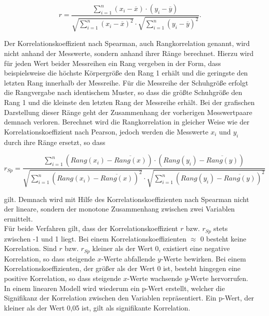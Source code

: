 \begin{equation}
r =  \frac{\sum \limits_{i=1}^n (x_i-\overline{x}) \cdot (y_i-\overline{y})}{\sqrt{\sum \limits_{i=1}^n (x_i-\overline{x})^2} \cdot \sqrt{\sum \limits_{i=1}^n (y_i-\overline{y})^2}}.
	\label{eq:pearson}
\end{equation}

Der Korrelationskoeffizient nach Spearman, auch Rangkorrelation genannt, wird nicht anhand der Messwerte, sondern anhand ihrer Ränge berechnet. Hierzu wird für jeden Wert beider Messreihen ein Rang vergeben in der Form, dass beispielsweise die höchste Körpergröße den Rang 1 erhält und die geringste den letzten Rang innerhalb der Messreihe. Für die Messreihe der Schuhgröße erfolgt die Rangvergabe nach identischem Muster, so dass die größte Schuhgröße den Rang 1 und die kleinste den letzten Rang der Messreihe erhält. Bei der grafischen Darstellung dieser Ränge geht der Zusammenhang der vorherigen Messwertpaare demnach verloren. Berechnet wird die Rangkorrelation in gleicher Weise wie der Korrelationskoeffizient nach Pearson, jedoch werden die Messwerte $x_i$ und $y_i$ durch ihre Ränge ersetzt, so dass 

\begin{equation}
r_{Sp} =  \frac{\sum \limits_{i=1}^n (Rang(x_i)-\overline{Rang(x)}) \cdot (Rang(y_i)-\overline{Rang(y)})}{\sqrt{\sum \limits_{i=1}^n (Rang(x_i)-\overline{Rang(x)})^2} \cdot \sqrt{\sum \limits_{i=1}^n (Rang(y_i)-\overline{Rang(y)})^2}}
	\label{eq:spearman}
\end{equation}

gilt. Demnach wird mit Hilfe des Korrelationskoeffizienten nach Spearman nicht der lineare, sondern der monotone Zusammenhang zwischen zwei Variablen ermittelt. \parencite{frank_einfach_2006}\\

Für beide Verfahren gilt, dass der Korrelationskoeffizient $r$ bzw. $r_{Sp}$ stets zwischen -1 und 1 liegt. Bei einem Korrelationskoeffizienten $\approx$ 0 besteht keine Korrelation. Sind $r$ bzw. $r_{Sp}$ kleiner als der Wert 0, existiert eine negative Korrelation, so dass steigende $x$-Werte abfallende $y$-Werte bewirken. Bei einem Korrelationskoeffizienten, der größer als der Wert 0 ist, besteht hingegen eine positive Korrelation, so dass steigende $x$-Werte wachsende $y$-Werte hervorrufen. In einem linearen Modell wird wiederum ein p-Wert erstellt, welcher die Signifikanz der Korrelation zwischen den Variablen repräsentiert. Ein p-Wert, der kleiner als der Wert 0,05 ist, gilt als signifikante Korrelation. \parencite{frank_einfach_2006}\\

